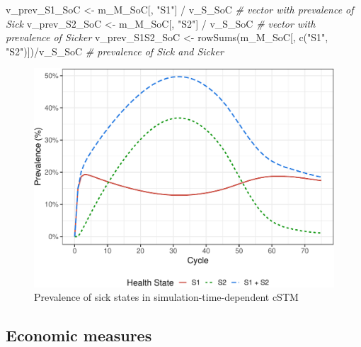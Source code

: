\documentclass[
]{article}
\newenvironment{Shaded}{\begin{snugshade}}{\end{snugshade}}
\newcommand{\CommentTok}[1]{\textcolor[rgb]{0.56,0.35,0.01}{\textit{#1}}}
\newcommand{\FunctionTok}[1]{\textcolor[rgb]{0.00,0.00,0.00}{#1}}
\newcommand{\NormalTok}[1]{#1}
\newcommand{\OtherTok}[1]{\textcolor[rgb]{0.56,0.35,0.01}{#1}}
\newcommand{\SpecialCharTok}[1]{\textcolor[rgb]{0.00,0.00,0.00}{#1}}
\newcommand{\StringTok}[1]{\textcolor[rgb]{0.31,0.60,0.02}{#1}}
\begin{document}
\begin{Shaded}
\begin{Highlighting}[]
\NormalTok{v\_prev\_S1\_SoC   }\OtherTok{\textless{}{-}}\NormalTok{ m\_M\_SoC[, }\StringTok{"S1"}\NormalTok{] }\SpecialCharTok{/}\NormalTok{ v\_S\_SoC          }\CommentTok{\# vector with prevalence of Sick}
\NormalTok{v\_prev\_S2\_SoC   }\OtherTok{\textless{}{-}}\NormalTok{ m\_M\_SoC[, }\StringTok{"S2"}\NormalTok{] }\SpecialCharTok{/}\NormalTok{ v\_S\_SoC          }\CommentTok{\# vector with prevalence of Sicker}
\NormalTok{v\_prev\_S1S2\_SoC }\OtherTok{\textless{}{-}} \FunctionTok{rowSums}\NormalTok{(m\_M\_SoC[, }\FunctionTok{c}\NormalTok{(}\StringTok{"S1"}\NormalTok{, }\StringTok{"S2"}\NormalTok{)])}\SpecialCharTok{/}\NormalTok{v\_S\_SoC }\CommentTok{\# prevalence of Sick and Sicker}
\end{Highlighting}
\end{Shaded}

\begin{figure}[H]

{\centering \includegraphics{figs/Sick-Sicker-Prev-AgeDep-1} 

}

\caption{Prevalence of sick states in simulation-time-dependent cSTM}\label{fig:Sick-Sicker-Prev-AgeDep}
\end{figure}

\hypertarget{economic-measures}{%
\subsection{Economic measures}\label{economic-measures}}
\end{document}
